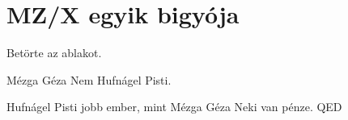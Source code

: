 \section{MZ/X egyik bigyója}
Betörte az ablakot.
\begin{definicio}{Mézga Géza}
Nem Hufnágel Pisti.
\end{definicio}
\begin{bizonyitas}{Hufnágel Pisti jobb ember, mint Mézga Géza}
Neki van pénze. QED
\end{bizonyitas}